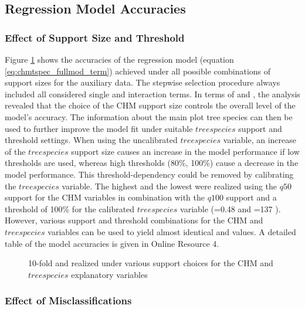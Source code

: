 \subsection{Regression Model Accuracies}
\label{sec:supp_chm_tspec_res}


\subsubsection*{Effect of Support Size and Threshold}

Figure \ref{fig:supp_perf_res} shows the accuracies of the regression model (equation \ref{eq:chmtspec_fullmod_term}) achieved under all possible combinations of support sizes for the auxiliary data. The stepwise selection procedure always included all considered single and interaction terms. In terms of \adjrsq{} and \rmsecv{}, the analysis revealed that the choice of the CHM support size controls the overall level of the model's accuracy. The information about the main plot tree species can then be used to further improve the model fit under suitable $treespecies$ support and threshold settings. When using the uncalibrated $treespecies$ variable, an increase of the $treespecies$ support size causes an increase in the model performance if low thresholds are used, whereas high thresholds (80\%, 100\%) cause a decrease in the model performance. This threshold-dependency could be removed by calibrating the $treespecies$ variable. The highest \adjrsq{} and the lowest \rmsecv{} were realized using the $q50$ support for the CHM variables in combination with the $q100$ support and a threshold of 100\% for the calibrated $treespecies$ variable (\adjrsq{}=0.48 and \rmsecv{}=137 \mha{}). However, various support and threshold combinations for the CHM and $treespecies$ variables can be used to yield almost identical \rmsecv{} and \adjrsq{} values. A detailed table of the model accuracies is given in Online Resource 4.

\begin{figure}
\centering
{}
\caption{10-fold \rmsecv{} and \adjrsq{} realized under various support choices for the CHM and $tree species$ explanatory variables}
\label{fig:supp_perf_res}
\end{figure}



\subsubsection*{Effect of Misclassifications}

